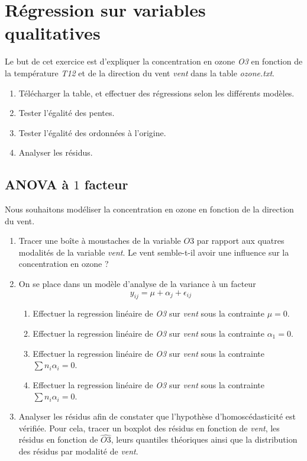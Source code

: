 \section{Régression sur variables qualitatives}

Le but de cet exercice est d'expliquer la concentration en ozone \textit{O3} en fonction de la température \textit{T12} et de la direction du vent \textit{vent} dans la table \textit{ozone.txt}.\\

\begin{enumerate}
\item Télécharger la table, et effectuer des régressions selon les différents modèles.
\item Tester l'égalité des pentes.
\item Tester l'égalité des ordonnées à l'origine.
\item Analyser les résidus.
\end{enumerate}

\subsection{ANOVA à $1$ facteur}

Nous souhaitons modéliser la concentration en ozone en fonction de la direction du vent.

\begin{enumerate}
\item Tracer une boîte à moustaches de la variable $O3$ par rapport aux quatres modalités de la variable \textit{vent}. Le vent semble-t-il avoir une influence sur la concentration en ozone ?
\item On se place dans un modèle d'analyse de la variance à un facteur
\[y_{ij}=\mu + \alpha_j+\epsilon_{ij}\]
\begin{enumerate}
\item Effectuer la regression linéaire de \textit{O3} sur \textit{vent} sous la contrainte $\mu = 0$.
\item Effectuer la regression linéaire de \textit{O3} sur \textit{vent} sous la contrainte $\alpha_1 = 0$.
\item Effectuer la regression linéaire de \textit{O3} sur \textit{vent} sous la contrainte $\sum n_i \alpha_i = 0$.
\item Effectuer la regression linéaire de \textit{O3} sur \textit{vent} sous la contrainte $\sum n_i \alpha_i = 0$.
\end{enumerate}
\item Analyser les résidus afin de constater que l'hypothèse d'homoscédasticité est vérifiée. Pour cela, tracer un boxplot des résidus en fonction de \textit{vent}, les résidus en fonction de $\hat{O3}$, leurs quantiles théoriques ainsi que la distribution des résidus par modalité de \textit{vent}.
\end{enumerate}

